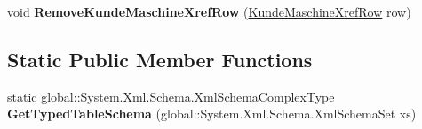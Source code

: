 \begin{DoxyCompactItemize}
\item 
void {\bfseries Remove\+Kunde\+Maschine\+Xref\+Row} (\hyperlink{class_products_1_1_data_1_1ds_sage_1_1_kunde_maschine_xref_row}{Kunde\+Maschine\+Xref\+Row} row)\hypertarget{class_products_1_1_data_1_1ds_sage_1_1_kunde_maschine_xref_data_table_afd633e916e6021304fc54bbda500e352}{}\label{class_products_1_1_data_1_1ds_sage_1_1_kunde_maschine_xref_data_table_afd633e916e6021304fc54bbda500e352}

\end{DoxyCompactItemize}
\subsection*{Static Public Member Functions}
\begin{DoxyCompactItemize}
\item 
static global\+::\+System.\+Xml.\+Schema.\+Xml\+Schema\+Complex\+Type {\bfseries Get\+Typed\+Table\+Schema} (global\+::\+System.\+Xml.\+Schema.\+Xml\+Schema\+Set xs)\hypertarget{class_products_1_1_data_1_1ds_sage_1_1_kunde_maschine_xref_data_table_a2b53453b16dbb0901da5734216cb4954}{}\label{class_products_1_1_data_1_1ds_sage_1_1_kunde_maschine_xref_data_table_a2b53453b16dbb0901da5734216cb4954}

\end{DoxyCompactItemize}
